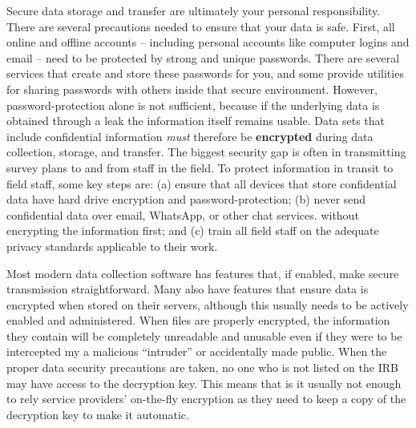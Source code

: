 Secure data storage and transfer are ultimately your personal responsibility.
There are several precautions needed to ensure that your data is safe.
First, all online and offline accounts
-- including personal accounts like computer logins and email --
need to be protected by strong and unique passwords.
There are several services that create and store these passwords for you,
and some provide utilities for sharing passwords with others
inside that secure environment.
However, password-protection alone is not sufficient,
because if the underlying data is obtained through a leak the information itself remains usable.
Data sets that include confidential information
\textit{must} therefore be \textbf{encrypted}
during data collection, storage, and transfer.
The biggest security gap is often in transmitting survey plans to and from staff in the field.
To protect information in transit to field staff, some key steps are:
(a) ensure that all devices that store confidential data
have hard drive encryption and password-protection;
(b) never send confidential data over email, WhatsApp, or other chat services.
without encrypting the information first; and
(c) train all field staff on the adequate privacy standards applicable to their work.

Most modern data collection software has features that,
if enabled, make secure transmission straightforward.
Many also have features that ensure data is encrypted when stored on their servers,
although this usually needs to be actively enabled and administered.
When files are properly encrypted,
the information they contain will be completely unreadable and unusable
even if they were to be intercepted my a malicious
``intruder'' or accidentally made public.
When the proper data security precautions are taken,
no one who is not listed on the IRB may have access to the decryption key.
This means that is it usually not
enough to rely service providers' on-the-fly encryption as they need to keep a copy
of the decryption key to make it automatic.

